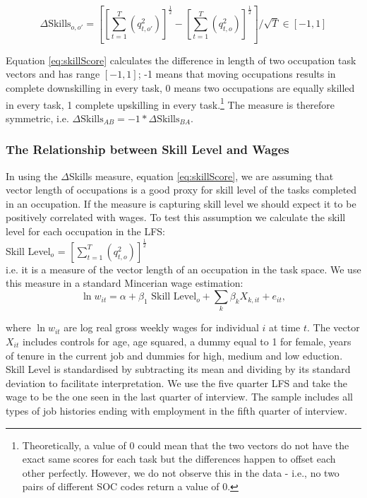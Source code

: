\documentclass[11pt, oneside]{article}
\begin{document}
	\begin{equation}
	\label{eq:skillScore}
	\Delta\text{Skills}_{o,o'} = \left[\left[\sum_{t=1}^{T}(q_{t,o'}^{2})\right]^{\frac{1}{2}} - \left[\sum_{t=1}^{T}(q_{t,o}^{2})\right]^{\frac{1}{2}} \right]/\sqrt{T} \in[-1,1]
	\end{equation}
	
	
	\noindent Equation \ref{eq:skillScore} calculates the difference in length of two occupation task vectors and has range $[-1,1]$; -1 means that moving occupations results in complete downskilling in every task, 0 means two occupations are equally skilled in every task, 1 complete upskilling in every task.\footnote{Theoretically, a value of 0 could mean that the two vectors do not have the exact same scores for each task but the differences happen to offset each other perfectly. However, we do not observe this in the data - i.e., no two pairs of different SOC codes return a value of 0. } The measure is therefore symmetric, i.e. $\Delta\text{Skills}_{{A}{B}}  = -1* \Delta\text{Skills}_{{B}{A}}$.
	
	\subsubsection{The Relationship between Skill Level and Wages}
	In using the $\Delta$Skills measure, equation \ref{eq:skillScore}, we are assuming that vector length of occupations is a good proxy for skill level of the tasks completed in an occupation. If the measure is capturing skill level we should expect it to be positively correlated with wages. To test this assumption we calculate the skill level for each occupation in the LFS: \\
	
	 Skill Level$_{o}$ = $\left[\sum_{t=1}^{T}(q_{t,o}^{2})\right]^{\frac{1}{2}} $ \\
	 
	\noindent  i.e. it is a measure of the vector length of an occupation in the task space. We use this measure in a standard Mincerian wage estimation: 
	\begin{equation}
	\label{eq:skill_returns}
	\ln w_{it}= \alpha + \beta_{1}\text{ Skill Level}_{o}+  \sum_{k} \beta_{k}X_{k,it} + e_{it}, 
	\end{equation}
	
	where $\ln w_{it}$ are log real gross weekly wages for individual $i$ at time $t$. The vector $X_{it}$ includes controls for age, age squared, a dummy equal to 1 for female, years of tenure in the current job and dummies for high, medium and low eduction. Skill Level is standardised by subtracting its mean and dividing by its standard deviation to facilitate interpretation. We use the five quarter LFS and take the wage to be the one seen in the last quarter of interview. The sample includes all types of job histories ending with employment in the fifth quarter of interview.
	
\end{document}
